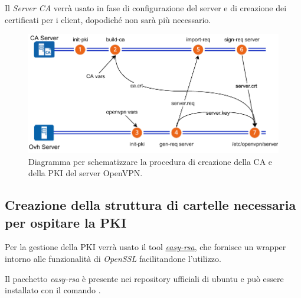 Il \textit{Server CA} verrà usato in fase di configurazione del server e di creazione dei certificati per i client, dopodiché non sarà più necessario.

\begin{figure}[H]
    \centering
    \includegraphics[width=1\linewidth]{immagini/diag-firma_certificato_ca}
    \caption{Diagramma per schematizzare la procedura di creazione della CA e della PKI del server OpenVPN.}
    \label{fig:diag-firma_certificato_ca}
\end{figure}


\subsection{Creazione della struttura di cartelle necessaria per ospitare la PKI \ok}
\label{subsec:pki_structure}

Per la gestione della PKI verrà usato il tool \href{https://github.com/OpenVPN/easy-rsa}{\textit{easy-rsa}}, che fornisce un wrapper intorno alle funzionalità di \textit{OpenSSL} facilitandone l'utilizzo.

Il pacchetto \textit{easy-rsa} è presente nei repository ufficiali di ubuntu e può essere installato con il comando .

